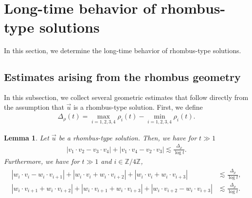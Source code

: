 \documentclass[reqno]{amsart}
\theoremstyle{plain}
\newtheorem{lemma}[theorem]{Lemma}
\theoremstyle{definition}
\numberwithin{equation}{section}
\begin{document}
\section{Long-time behavior of rhombus-type solutions}

In this section,  we determine the long-time behavior of rhombus-type solutions.


\subsection{Estimates arising from the rhombus geometry}

In this subsection, we collect several geometric estimates that follow directly from the assumption that $\vec{u}$ is a rhombus-type solution. First, we define
\begin{align}\label{sadef}
\Delta_{\rho}(t)=\max_{i=1,2,3,4}\rho_i(t)-\min_{i=1,2,3,4}\rho_i(t).
\end{align}



\begin{lemma}\label{hishinaisekilem1}
Let $\vec{u}$ be a rhombus-type solution. Then, we have for $t\gg 1$
\begin{align}\label{naisekirhombes}
\left|v_1\cdot v_2-v_3\cdot v_4\right|+\left|v_1\cdot v_4-v_2\cdot v_3\right|\lesssim \frac{\Delta_{\rho}}{\log{t}}.
\end{align}
Furthermore, we have for $t\gg 1$ and $i\in\mathbb{Z}/4\mathbb{Z}$,
\begin{align}\label{naisekirhombes2}
\begin{aligned}
\left|w_i\cdot v_i-w_i\cdot v_{i+1}\right|+\left|w_i\cdot v_i+w_i\cdot v_{i+2}\right|+\left|w_i\cdot v_i+w_i\cdot v_{i+3}\right|&\lesssim \frac{\Delta_{\rho}}{\log{t}},
\\
\left|w_i\cdot v_{i+1}+w_i\cdot v_{i+2}\right|+\left|w_i\cdot v_{i+1}+w_i\cdot v_{i+3}\right|+\left|w_i\cdot v_{i+2}-w_i\cdot v_{i+3}\right|&\lesssim \frac{\Delta_{\rho}}{\log{t}}.
\end{aligned}
\end{align}
\end{lemma}
\end{document}
